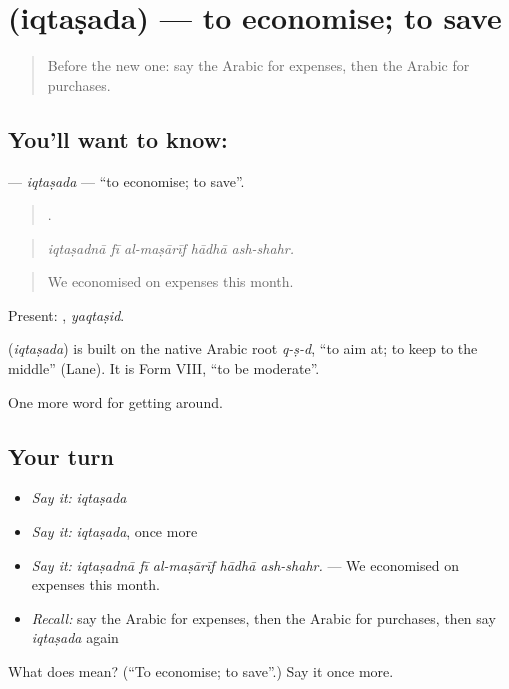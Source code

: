 \section[\texorpdfstring{\ar{اقتصد} (iqtaṣada)}{اقتصد (iqtaṣada)}]{ (iqtaṣada) — to economise; to save}

\label{lesson:AR-C459-iqtasada}



\begin{quote}
Before the new one: say the Arabic for expenses, then the Arabic for purchases.
\end{quote}

\subsection*{You'll want to know: }
\textbf{} — \emph{iqtaṣada} — \textquotedblleft{}to economise; to save\textquotedblright{}.

\begin{quote}
    .
\end{quote}

\begin{quote}
\emph{iqtaṣadnā fī al-maṣārīf hādhā ash-shahr.}
\end{quote}

\begin{quote}
We economised on expenses this month.
\end{quote}

Present: , \emph{yaqtaṣid}.

\begin{cousinweb}
\textbf{} (\emph{iqtaṣada}) is built on the native Arabic root \emph{q-ṣ-d}, \textquotedblleft{}to aim at; to keep to the middle\textquotedblright{} (Lane). It is Form VIII, \textquotedblleft{}to be moderate\textquotedblright{}.
\end{cousinweb}

\begin{grammarlens}[title={What you've built}]
One more word for getting around.
\end{grammarlens}

\subsection*{Your turn}
\begin{itemize}
\raggedright
  \item \emph{Say it:} \emph{iqtaṣada}
  \item \emph{Say it:} \emph{iqtaṣada}, once more
  \item \emph{Say it:} \emph{iqtaṣadnā fī al-maṣārīf hādhā ash-shahr.} — We economised on expenses this month.
  \item \emph{Recall:} say the Arabic for expenses, then the Arabic for purchases, then say \emph{iqtaṣada} again
\end{itemize}

\begin{tcolorbox}[breakable,colback=teal!4,colframe=teal!35!black,title={Before you move on}]
What does  mean? (\textquotedblleft{}To economise; to save\textquotedblright{}.) Say it once more.
\end{tcolorbox}

